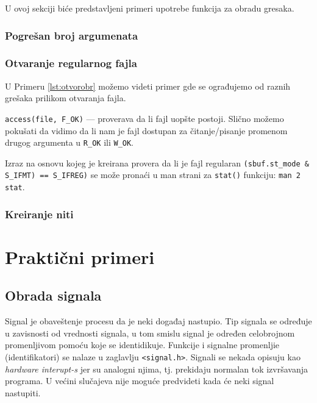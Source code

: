 \documentclass[a4paper, 11pt]{article}
\newcommand{\scode}[3] {
	\hspace{.06\textwidth} 
	\begin{minipage}[t]{.88\textwidth} %
		\begin{mdframed}[topline=true,bottomline=true,leftline=true,rightline=true,backgroundcolor=gray!22, linecolor=gray!60!black,roundcorner=1mm]
			 

	\begin{center}
		\caption{\textbf{Primer \ref{lst:#3}:} #2}
	\end{center}
	\end{mdframed}
	\end{minipage}

}
\begin{document}
U ovoj sekciji biće predstavljeni primeri upotrebe funkcija za obradu gresaka.

\subsubsection{Pogrešan broj argumenata}

\scode{wnarg.c}{Pogresan broj argumenata}{wnarg}

\subsubsection{Otvaranje regularnog fajla}

U Primeru \ref{lst:otvorobr} možemo videti primer gde se ograđujemo od raznih grešaka prilikom otvaranja fajla.

\scode{openerchk.c}{Otvaranje regularnog fajla}{otvorobr}
\vspace{2mm} 

\texttt{access(file, F\_OK)} --- proverava da li fajl uopšte postoji. Slično možemo pokušati da vidimo da li nam je fajl dostupan za čitanje/pisanje promenom drugog argumenta u \texttt{R\_OK} ili \texttt{W\_OK}.

Izraz na osnovu kojeg je kreirana provera da li je fajl regularan \texttt{(sbuf.st\_mode \& S\_IFMT) == S\_IFREG)} se može pronaći u man strani za \texttt{stat()} funkciju: \texttt{man 2 stat}.

\subsubsection{Kreiranje niti}

\scode{pthcrer.c}{Obrada greske za funkcije koje rade sa threadovima}{pthcrer}


 

\newpage

\section{Praktični primeri}

\subsection{Obrada signala}

Signal je obaveštenje procesu da je neki događaj nastupio. Tip signala se određuje u zavisnosti od vrednosti signala, u tom smislu signal je određen celobrojnom promenljivom pomoću koje se identidikuje. Funkcije i signalne promenljie (identifikatori) se nalaze u zaglavlju \texttt{<signal.h>}. Signali se nekada opisuju kao \emph{hardware interupt-s} jer su analogni njima, tj. prekidaju normalan tok izvršavanja programa. U većini slučajeva nije moguće predvideti kada će neki signal nastupiti.
\end{document}
